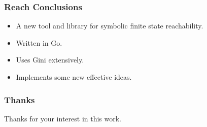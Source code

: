 \documentclass{beamer}
\begin{document}
\begin{frame}
	\frametitle{Reach Conclusions}
	\begin{itemize}
		\item A new tool and library for symbolic finite state reachability.
		\item Written in Go.
		\item Uses Gini extensively. 
		\item Implements some new effective ideas.
	\end{itemize}
\end{frame}

\begin{frame}
	\frametitle{Thanks}
	\begin{center}
		\Large{Thanks for your interest in this work.}
	\end{center}
\end{frame}
\end{document}
